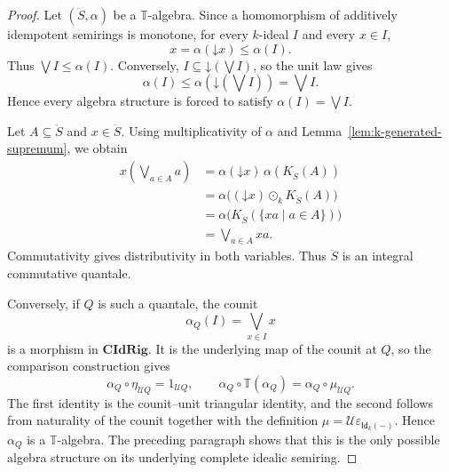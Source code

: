 \documentclass[12pt,leqno]{amsart}
\newcommand{\CIdRig}{\mathbf{CIdRig}}
\newcommand{\Idk}{\mathsf{Id}_{k}}
\theoremstyle{definition}
\numberwithin{equation}{section}
\theoremstyle{remark}
\def\leq{\leqslant}
\begin{document}
\begin{proof}
Let \((\ddot S,\alpha)\) be a \(\mathbb T\)-algebra. Since a homomorphism of additively idempotent semirings is monotone, for every $k$-ideal $I$ and every \(x\in I\),
\[
x=\alpha(\mathord\downarrow x)\leq\alpha(I).
\]
Thus \(\bigvee I\leq\alpha(I)\). Conversely,
\(I\subseteq\mathord\downarrow(\bigvee I)\), so the unit law gives
\[
\alpha(I)\leq
\alpha(\mathord\downarrow(\bigvee I))
 =\bigvee I.
\]
Hence every algebra structure is forced to satisfy
\(\alpha(I)=\bigvee I\).

Let \(A\subseteq\ddot S\) and \(x\in\ddot S\). Using multiplicativity of $\alpha$ and Lemma~\ref{lem:k-generated-supremum}, we obtain
\begin{align*}
x\left(\bigvee_{a\in A}a\right)
 &=\alpha(\mathord\downarrow x)\,
   \alpha(K_{\ddot S}(A))\\
 &=\alpha\bigl((\mathord\downarrow x)\odot_kK_{\ddot S}(A)\bigr)\\
 &=\alpha\bigl(K_{\ddot S}(\{xa\mid a\in A\})\bigr)\\
 &=\bigvee_{a\in A}xa.
\end{align*}
Commutativity gives distributivity in both variables. Thus \(\ddot S\) is an integral commutative quantale.

Conversely, if $Q$ is such a quantale, the counit
\[
\alpha_Q(I)=\bigvee_{x\in I}x
\]
is a morphism in \(\CIdRig\). It is the underlying map of the counit at $Q$, so the comparison construction gives
\[
\alpha_Q\circ\eta_{\mathcal UQ}=1_{\mathcal UQ},
\qquad
\alpha_Q\circ\mathbb T(\alpha_Q)
 =\alpha_Q\circ\mu_{\mathcal UQ}.
\]
The first identity is the counit--unit triangular identity, and the second follows from naturality of the counit together with the definition
\(\mu=\mathcal U\varepsilon_{\Idk(-)}\). Hence \(\alpha_Q\) is a \(\mathbb T\)-algebra. The preceding paragraph shows that this is the only possible algebra structure on its underlying complete idealic semiring.


\end{proof}
\end{document}

